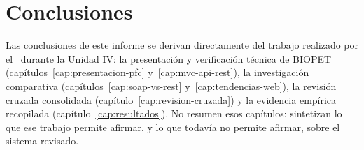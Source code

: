 \chapter{Conclusiones}
\label{cap:conclusiones}

Las conclusiones de este informe se derivan directamente del trabajo
realizado por el \equipoga\ durante la Unidad IV: la presentaci\'on y
verificaci\'on t\'ecnica de BIOPET (cap\'itulos~\ref{cap:presentacion-pfc}
y~\ref{cap:mvc-api-rest}), la investigaci\'on comparativa
(cap\'itulos~\ref{cap:soap-vs-rest} y~\ref{cap:tendencias-web}), la
revisi\'on cruzada consolidada (cap\'itulo~\ref{cap:revision-cruzada}) y la
evidencia emp\'irica recopilada (cap\'itulo~\ref{cap:resultados}). No
resumen esos cap\'itulos: sintetizan lo que ese trabajo permite afirmar, y
lo que todav\'ia no permite afirmar, sobre el sistema revisado.

